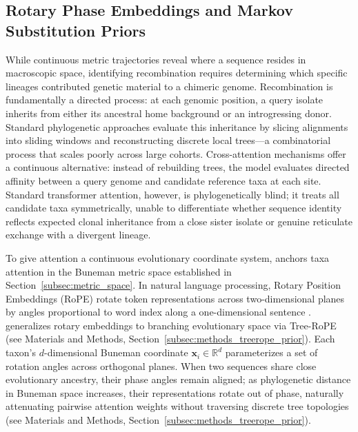\subsection{Rotary Phase Embeddings and Markov Substitution Priors}
\label{subsec:rotary_prior}

While continuous metric trajectories reveal where a sequence resides in macroscopic space, identifying recombination requires determining which specific lineages contributed genetic material to a chimeric genome.
Recombination is fundamentally a directed process: at each genomic position, a query isolate inherits from either its ancestral home background or an introgressing donor.
Standard phylogenetic approaches evaluate this inheritance by slicing alignments into sliding windows and reconstructing discrete local trees---a combinatorial process that scales poorly across large cohorts.
Cross-attention mechanisms offer a continuous alternative: instead of rebuilding trees, the model evaluates directed affinity between a query genome and candidate reference taxa at each site.
Standard transformer attention, however, is phylogenetically blind; it treats all candidate taxa symmetrically, unable to differentiate whether sequence identity reflects expected clonal inheritance from a close sister isolate or genuine reticulate exchange with a divergent lineage.

To give attention a continuous evolutionary coordinate system, \RhizAeon anchors taxa attention in the Buneman metric space established in Section~\ref{subsec:metric_space}.
In natural language processing, Rotary Position Embeddings (RoPE) rotate token representations across two-dimensional planes by angles proportional to word index along a one-dimensional sentence \citep{su2024roformer}.
\RhizAeon generalizes rotary embeddings to branching evolutionary space via Tree-RoPE (see Materials and Methods, Section~\ref{subsec:methods_treerope_prior}).
Each taxon's $d$-dimensional Buneman coordinate $\mathbf{x}_i \in \mathbb{R}^d$ parameterizes a set of rotation angles across orthogonal planes.
When two sequences share close evolutionary ancestry, their phase angles remain aligned; as phylogenetic distance in Buneman space increases, their representations rotate out of phase, naturally attenuating pairwise attention weights without traversing discrete tree topologies (see Materials and Methods, Section~\ref{subsec:methods_treerope_prior}).

